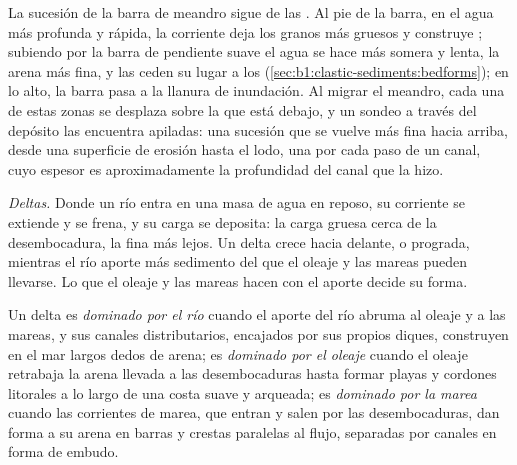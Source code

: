 La sucesión de la barra de meandro sigue de las . Al pie de la barra, en el agua más profunda y rápida, la corriente deja los granos más gruesos y construye ; subiendo por la
barra de pendiente suave el agua se hace más somera y lenta, la arena más fina, y las  ceden su lugar a los  (\cref{sec:b1:clastic-sediments:bedforms}); en lo alto, la barra pasa a la
llanura de inundación. Al migrar el meandro, cada una de estas zonas se desplaza sobre la que está debajo, y un sondeo a través del depósito las encuentra apiladas: una sucesión que se vuelve
más fina hacia arriba, desde una superficie de erosión hasta el lodo, una por cada paso de un canal, cuyo espesor es aproximadamente la profundidad del canal que la hizo.

\emph{Deltas.} Donde un río entra en una masa de agua en reposo, su corriente se extiende y se frena, y su carga se deposita: la carga gruesa cerca de la desembocadura, la fina más lejos. Un delta
crece hacia delante, o prograda, mientras el río aporte más sedimento del que el oleaje y las mareas pueden llevarse. Lo que el oleaje y las mareas hacen con el aporte decide su forma.

\begin{definition}\label{def:b1:clastic-sediments:delta}
Un delta es \emph{dominado por el río} cuando el aporte del río abruma al oleaje y a las mareas, y sus canales distributarios, encajados por sus propios
diques, construyen en el mar largos dedos de arena; es \emph{dominado por el oleaje} cuando el oleaje retrabaja la arena llevada a las desembocaduras
hasta formar playas y cordones litorales a lo largo de una costa suave y arqueada; es \emph{dominado por la marea} cuando las corrientes de marea, que entran y
salen por las desembocaduras, dan forma a su arena en barras y crestas paralelas al flujo, separadas por canales en forma de embudo.
\end{definition}

